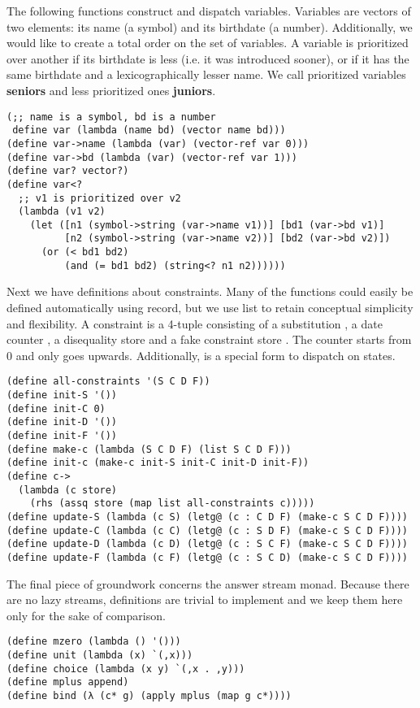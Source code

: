 The following functions construct and dispatch variables. Variables are vectors of two elements: its name (a symbol) and its birthdate (a number). Additionally, we would like to create a total order on the set of variables. A variable is prioritized over another if its birthdate is less (i.e. it was introduced sooner), or if it has the same birthdate and a lexicographically lesser name. We call prioritized variables \textbf{seniors} and less prioritized ones \textbf{juniors}.
\begin{lstlisting}
(;; name is a symbol, bd is a number
 define var (lambda (name bd) (vector name bd)))
(define var->name (lambda (var) (vector-ref var 0)))
(define var->bd (lambda (var) (vector-ref var 1)))
(define var? vector?)
(define var<?
  ;; v1 is prioritized over v2
  (lambda (v1 v2)
    (let ([n1 (symbol->string (var->name v1))] [bd1 (var->bd v1)]
          [n2 (symbol->string (var->name v2))] [bd2 (var->bd v2)])
      (or (< bd1 bd2)
          (and (= bd1 bd2) (string<? n1 n2))))))
\end{lstlisting}

Next we have definitions about constraints. Many of the functions could easily be defined automatically using record, but we use list to retain conceptual simplicity and flexibility. A constraint is a 4-tuple consisting of a substitution , a date counter , a disequality store  and a fake constraint store . The counter starts from 0 and only goes upwards. Additionally,  is a special form to dispatch on states.
\begin{lstlisting}
(define all-constraints '(S C D F))
(define init-S '())
(define init-C 0)
(define init-D '())
(define init-F '())
(define make-c (lambda (S C D F) (list S C D F)))
(define init-c (make-c init-S init-C init-D init-F))
(define c->
  (lambda (c store)
    (rhs (assq store (map list all-constraints c)))))
(define update-S (lambda (c S) (letg@ (c : C D F) (make-c S C D F))))
(define update-C (lambda (c C) (letg@ (c : S D F) (make-c S C D F))))
(define update-D (lambda (c D) (letg@ (c : S C F) (make-c S C D F))))
(define update-F (lambda (c F) (letg@ (c : S C D) (make-c S C D F))))
\end{lstlisting}

The final piece of groundwork concerns the answer stream monad. Because there are no lazy streams, definitions are trivial to implement and we keep them here only for the sake of comparison.
\begin{lstlisting}
(define mzero (lambda () '()))
(define unit (lambda (x) `(,x)))
(define choice (lambda (x y) `(,x . ,y)))
(define mplus append)
(define bind (λ (c* g) (apply mplus (map g c*))))
\end{lstlisting}

